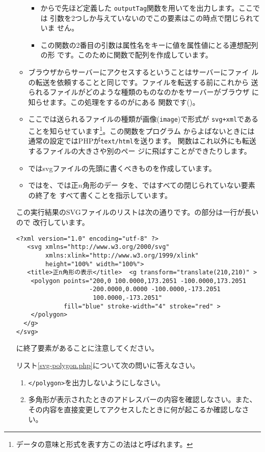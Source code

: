 \begin{itemize}
\begin{itemize}
\begin{itemize}
 \item {}からで先ほど定義した
       \texttt{outputTag}関数を用いてを出力します。ここでは
       引数を2つしか与えていないのでこの要素はこの時点で閉じられていま
       せん。
 \item この関数の2番目の引数は属性名をキーに値を属性値にとる連想配列の形
       です。このために関数で配列を作成しています。
\end{itemize}
 \item ブラウザからサーバーにアクセスするということはサーバーにファイ
       ルの転送を依頼することと同じです。ファイルを転送する前にこれから
       送られるファイルがどのような種類のものなのかをサーバーがブラウザ
       に知らせます。この処理をするのがにある
       関数です()。 
 \item ここでは送られるファイルの種類が画像(\texttt{image})で形式が
       \texttt{svg+xml}であることを知らせています\footnote{
       データの意味と形式を表す方この法はと呼ばれます。}。この関数をプログラム
       からよばないときには通常の設定ではPHPが\texttt{text/html}を送ります。
       関数はこれ以外にも転送するファイルの大きさや別のペー
       ジに飛ばすことができたりします。
 \item {}ではsvgファイルの先頭に書くべきものを作成しています。
 \item {}ではを、では正$n$角形のデー
       タを、ではすべての閉じられていない要素の終了を
       すべて書くことを指示しています。
\end{itemize}
この実行結果のSVGファイルのリストは次の通りです。の部分は一行が長いので
改行しています。
\begin{Verbatim}
<?xml version="1.0" encoding="utf-8" ?>
   <svg xmlns="http://www.w3.org/2000/svg"
        xmlns:xlink="http://www.w3.org/1999/xlink"
        height="100%" width="100%">
   <title>正n角形の表示</title>  <g transform="translate(210,210)" >
    <polygon points="200,0 100.0000,173.2051 -100.0000,173.2051
                    -200.0000,0.0000 -100.0000,-173.2051 
                     100.0000,-173.2051"
             fill="blue" stroke-width="4" stroke="red" >
    </polygon>
  </g>
</svg>
\end{Verbatim}
に終了要素があることに注意してください。
\begin{Problem}\upshape
リスト\ref{svg-polygon.php}について次の問いに答えなさい。
\begin{enumerate}
 \item \texttt{</polygon>}を出力しないようにしなさい。
 \item 多角形が表示されたときのアドレスバーの内容を確認しなさい。また、
       その内容を直接変更してアクセスしたときに何が起こるか確認しなさい。
\end{enumerate}
\end{Problem}


\end{itemize}
